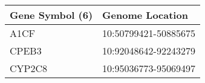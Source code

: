 \begin{tabular}{ll}
\toprule
Gene Symbol (6) &      Genome Location \\
\midrule
           A1CF & 10:50799421-50885675 \\
          CPEB3 & 10:92048642-92243279 \\
         CYP2C8 & 10:95036773-95069497 \\
\bottomrule
\end{tabular}
